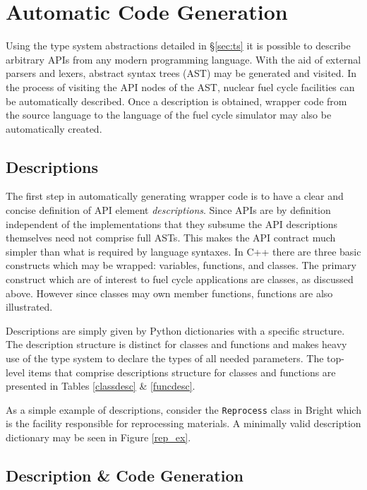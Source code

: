 \documentclass{ansconfpaper}
\newcommand{\vin}[1]{\texttt{{#1}}}
\begin{document}
\section{Automatic Code Generation}
\label{sec:codegen}

Using the type system abstractions detailed in \S \ref{sec:ts} it is possible
to describe arbitrary APIs from any modern programming language.  With the aid
of external parsers and lexers, abstract syntax trees (AST) may be generated 
and visited.  In the process of visiting the API nodes of the AST, nuclear 
fuel cycle facilities can be automatically described.  Once a description is 
obtained, wrapper code from the source language to the language of the fuel 
cycle simulator may also be automatically created.

\subsection{Descriptions}
\label{sec:desc}

The first step in automatically generating wrapper code is to have a clear and 
concise definition of API element \emph{descriptions}.  Since APIs are by definition 
independent of the implementations that they subsume the API descriptions themselves
need not comprise full ASTs.  This makes the API contract much simpler than what
is required by language syntaxes.  In C++ there are three
basic constructs which may be wrapped: variables, functions, and classes.  
The primary construct which are of interest to fuel cycle applications are classes, 
as discussed above.  However since classes may own member functions, functions are
also illustrated.

Descriptions are simply given by Python dictionaries with a specific structure.
The description structure is distinct for classes and functions and makes heavy 
use of the type system to declare the types of all needed parameters.  The top-level
items that comprise descriptions structure for classes and functions are presented 
in Tables \ref{classdesc} \& \ref{funcdesc}.

As a simple example of descriptions, consider the \vin{Reprocess} class in Bright 
which is the facility responsible for reprocessing materials. A minimally valid 
description dictionary may be seen in Figure \ref{rep_ex}. 

\subsection{Description \& Code Generation}
\label{sec:autodesc}
\end{document}
